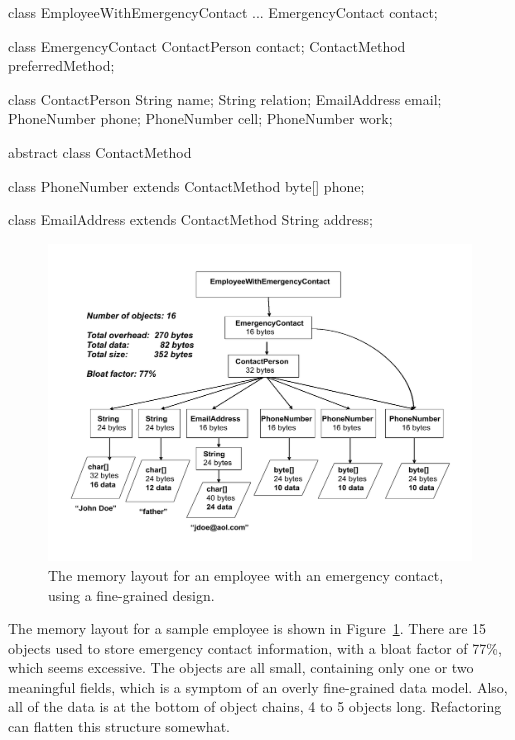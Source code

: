 \begin{shortlisting} 
class EmployeeWithEmergencyContact {
    ...
    EmergencyContact contact;
}
			
class EmergencyContact {
    ContactPerson contact;
    ContactMethod preferredMethod;
}
			
class ContactPerson {
    String name;
    String relation;
    EmailAddress email;
    PhoneNumber phone;
    PhoneNumber cell;
    PhoneNumber work;
}
			
abstract class ContactMethod {
}
			
class PhoneNumber extends ContactMethod {
    byte[] phone;
}
			
class EmailAddress extends ContactMethod {
    String address;
}
\end{shortlisting}
 \begin{figure}
  \centering
 \includegraphics[width=\textwidth]{part1/Figures/modelingdatatypes/employee-status-fine-grained.pdf}
  \caption{The memory layout for an employee with an emergency contact, using
  a fine-grained design.}
  \label{fig:employee-status-fine-grained}
\end{figure}
The memory layout for a sample employee is shown in Figure~\ref{fig:employee-status-fine-grained}. There
are 15 objects used to store emergency contact information, with a bloat factor of 77\%, which seems excessive.
The objects are all small, containing only one or two meaningful fields, which
is a symptom of an overly fine-grained
data model. Also, all of the data is at the bottom of object chains, 4 to 5 objects long. Refactoring
can flatten this structure somewhat.

